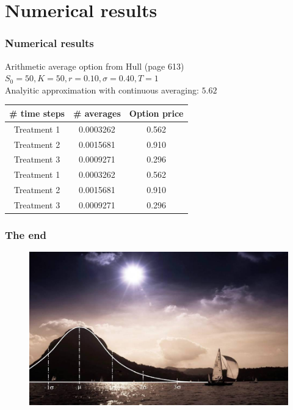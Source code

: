 \documentclass{beamer}
\begin{document}
\section{Numerical results}

\begin{frame}
\frametitle{Numerical results}
\begin{center}
Arithmetic average option from Hull (page 613)\\
$S_0=50, K = 50, r = 0.10, \sigma = 0.40, T = 1$ \\
Analyitic approximation with continuous averaging: $5.62$
\end{center}

\begin{table}
\begin{tabular}{c c c}
\toprule
\textbf{\# time steps} & \textbf{\# averages} & \textbf{Option price}\\
\midrule
Treatment 1 & 0.0003262 & 0.562 \\
Treatment 2 & 0.0015681 & 0.910 \\
Treatment 3 & 0.0009271 & 0.296 \\
Treatment 1 & 0.0003262 & 0.562 \\
Treatment 2 & 0.0015681 & 0.910 \\
Treatment 3 & 0.0009271 & 0.296 \\
\bottomrule
\end{tabular}
\end{table}
\end{frame}


\begin{frame}
\frametitle{The end}
\begin{figure}
	\includegraphics[scale=0.35]{end}
\end{figure}
\end{frame}

\end{document}

